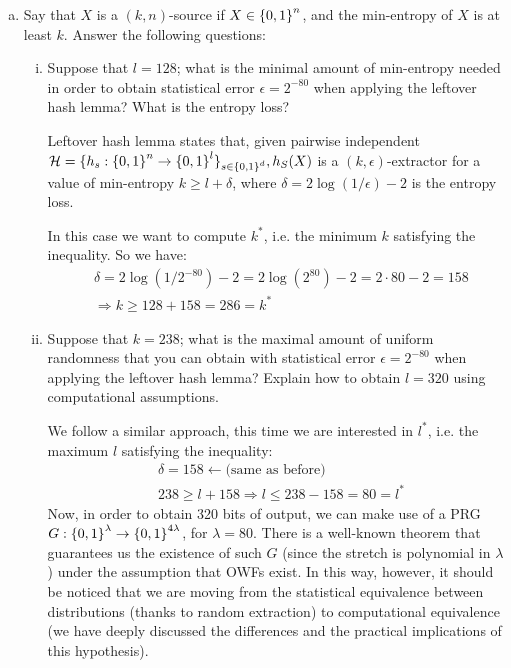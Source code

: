 \begin{enumerate}[(a)]
	\item Say that $X$ is a $(k, n)$-source if $X \in {\{0, 1\}}^n$, and the min-entropy of $X$ is at least $k$.
	      Answer the following questions:

	      \begin{enumerate}[(i)]
		      \item Suppose that $l = 128$; what is the minimal amount of min-entropy needed in order to obtain statistical error $\epsilon = 2^{-80}$ when applying the leftover hash lemma? What is the entropy loss?

		            \begin{solution}
			            Leftover hash lemma states that, given pairwise independent $\mathcal{H} = \{h_s: {\{0, 1\}}^n \to {\{0, 1\}}^l\}_{s \in {\{0, 1\}}^d}, h_S(X)$ is a $(k, \epsilon)$-extractor for a value of min-entropy $k \geq l + \delta$, where $\delta = 2 \log(1/\epsilon) - 2$ is the entropy loss.

			            In this case we want to compute $k^*$, i.e. the minimum $k$ satisfying the inequality. So we have:
			            \begin{align*}
				             & \delta = 2 \log(1/2^{-80}) - 2 = 2 \log(2^{80}) - 2 = 2\cdot 80 - 2 = 158 \\
				             & \Rightarrow k \ge 128 + 158 = 286 = k^*
			            \end{align*}
		            \end{solution}

		      \item Suppose that $k = 238$; what is the maximal amount of uniform randomness that you can obtain with statistical error $\epsilon = 2^{-80}$ when applying the leftover hash lemma? Explain how to obtain $l = 320$ using computational assumptions.

		            \begin{solution}
			            We follow a similar approach, this time we are interested in $l^*$, i.e. the maximum $l$ satisfying the inequality:
			            \begin{align*}
				             & \delta = 158 \leftarrow \mbox{(same as before)}        \\
				             & 238 \ge l + 158 \Rightarrow l \le 238 - 158 = 80 = l^*
			            \end{align*}
			            Now, in order to obtain 320 bits of output, we can make use of a PRG $G: {\{0, 1\}}^{\lambda} \to {\{0, 1\}}^{4\lambda}$, for $\lambda = 80$.
			            There is a well-known theorem that guarantees us the existence of such $G$ (since the stretch is polynomial in $\lambda$) under the assumption that OWFs exist. In this way, however, it should be noticed that we are moving from the statistical equivalence between distributions (thanks to random extraction) to computational equivalence (we have deeply discussed the differences and the practical implications of this hypothesis).
		            \end{solution}
	      \end{enumerate}
\end{enumerate}